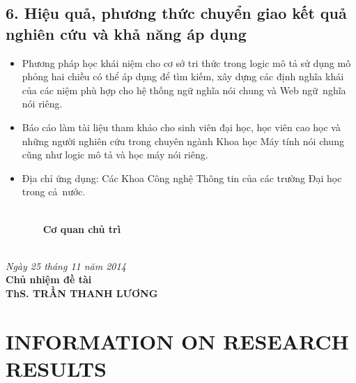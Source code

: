 \section*{6. Hiệu quả, phương thức chuyển giao kết quả nghiên cứu và khả năng áp dụng}
\begin{itemize}
	\item Phương pháp học khái niệm cho cơ sở tri thức trong logic mô tả sử dụng mô phỏng hai chiều có thể áp dụng để tìm kiếm, xây dựng các định nghĩa khái của các niệm phù hợp cho hệ thống ngữ nghĩa nói chung và Web ngữ~nghĩa nói riêng.

	\item Báo cáo làm tài liệu tham khảo cho sinh viên đại học, học viên cao học và những người nghiên cứu trong chuyên ngành Khoa học Máy tính nói chung cũng như logic mô tả và học máy nói riêng.

	\item Địa chỉ ứng dụng: Các Khoa Công nghệ Thông tin của các trường Đại học trong cả~nước.
\end{itemize}
\begin{minipage}{0.48\textwidth}
	\begin{flushleft}
		{\mbox{~}~}\\[0.4cm]
		{\bf\mbox{~~~~~~} Cơ quan chủ trì} \\[2.2cm]
		{~\;}
	\end{flushleft}
\end{minipage}
\begin{minipage}{0.55\textwidth}
	\begin{center}
		\textit{Ngày 25 tháng 11 năm 2014}\\
		{\bf Chủ nhiệm đề tài} \\[2.2cm]
		{\bf ThS. TRẦN THANH LƯƠNG}
	\end{center}
\end{minipage}		

\cleardoublepage
\newpage
\chapter*{INFORMATION ON RESEARCH RESULTS}
\thispagestyle{fancy}

